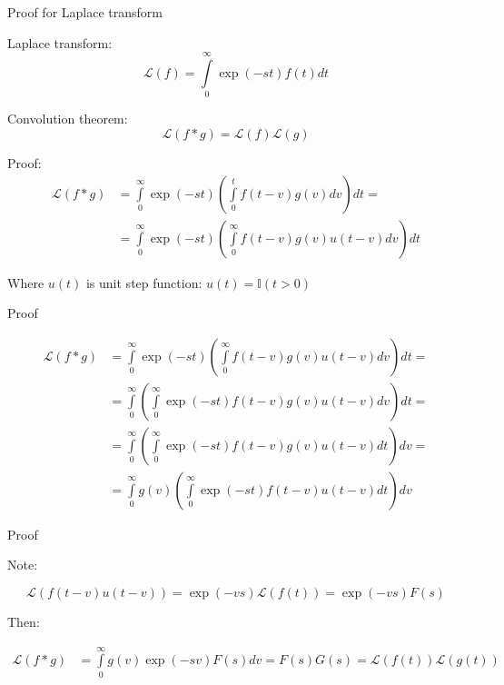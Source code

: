 \documentclass[10pt]{beamer}
\begin{document}
\begin{frame}{Proof for Laplace transform}

\begin{block}{Laplace transform:}
\begin{equation}
    \mathcal{L}(f) = \int \limits_0^\infty \exp(-st) f(t)dt  
\end{equation}
\end{block}

\begin{block}{Convolution theorem:}
\begin{equation}
    \mathcal{L}(f*g) = \mathcal{L}(f)\mathcal{L}(g)
\end{equation}
\end{block}

\begin{block}{Proof:}
\begin{align}
    \mathcal{L}(f*g) &= \int \limits_0^\infty \exp(-st) \left(\int \limits_0^t f(t - v) g(v) dv \right) dt  =\\
    &= \int \limits_0^\infty \exp(-st) \left(\int \limits_0^\infty f(t - v) g(v) u(t -v) dv \right) dt
\end{align}

Where $u(t)$ is unit step function: $u(t) = \mathbb{I}(t > 0)$
\end{block}
    
\end{frame}


\begin{frame}{Proof}



\begin{align}
    \mathcal{L}(f*g) &= \int \limits_0^\infty \exp(-st) \left(\int \limits_0^\infty f(t - v) g(v) u(t -v) dv \right) dt =\\
    &= \int \limits_0^\infty \left(\int \limits_0^\infty \exp(-st)  f(t - v) g(v) u(t -v) dv \right) dt =\\
    &= \int \limits_0^\infty \left(\int \limits_0^\infty \exp(-st)  f(t - v) g(v) u(t -v) dt \right) dv =\\
    &= \int \limits_0^\infty g(v) \left(\int \limits_0^\infty \exp(-st)  f(t - v) u(t -v) dt \right) dv
\end{align}





    
\end{frame}


\begin{frame}{Proof}

Note:

\begin{equation}
    \mathcal{L}(f(t-v)u(t-v)) = \exp(-vs) \mathcal{L} (f(t)) = \exp(-vs) F(s)
\end{equation}

Then:

\begin{align}
    \mathcal{L}(f*g) &= \int \limits_0^\infty g(v) \exp(-sv) F(s) dv = F(s) G(s) = \mathcal{L}(f(t))\mathcal{L}(g(t))
\end{align}

    
\end{frame}
\end{document}
